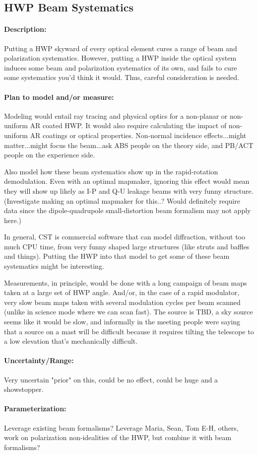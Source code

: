 
\subsection{HWP Beam Systematics}


\paragraph{Description:}
Putting a HWP skyward of every optical element cures a range of beam and polarization systematics. However, putting a HWP inside the optical system induces some beam and polarization systematics of its own, and fails to cure some systematics you'd think it would. Thus, careful consideration is needed.

\paragraph{Plan to model and/or measure:}
Modeling would entail ray tracing and physical optics for a non-planar or non-uniform AR coated HWP. It would also require calculating the impact of non-uniform AR coatings or optical properties. Non-normal incidence effects...might matter...might focus the beam...ask ABS people on the theory side, and PB/ACT people on the experience side.

Also model how these beam systematics show up in the rapid-rotation demodulation. Even with an optimal mapmaker, ignoring this effect would mean they will show up likely as I-P and Q-U leakage beams with very funny structure. (Investigate making an optimal mapmaker for this..? Would definitely require data since the dipole-quadrupole small-distortion beam formalism may not apply here.)

In general, CST is commercial software that can model diffraction, without too much CPU time, from very funny shaped large structures (like struts and baffles and things). Putting the HWP into that model to get some of these beam systematics might be interesting.

Measurements, in principle, would be done with a long campaign of beam maps taken at a large set of HWP angle. And/or, in the case of a rapid modulator, very slow beam maps taken with several modulation cycles per beam scanned (unlike in science mode where we can scan fast). The source is TBD, a sky source seems like it would be slow, and informally in the meeting people were saying that a source on a mast will be difficult because it requires tilting the telescope to a low elevation that's mechanically difficult.

\paragraph{Uncertainty/Range:}
Very uncertain "prior" on this, could be no effect, could be huge and a showstopper.

\paragraph{Parameterization:}

Leverage existing beam formalisms? Leverage Maria, Sean, Tom E-H, others, work on polarization non-idealities of the HWP, but combine it with beam formalisms?
